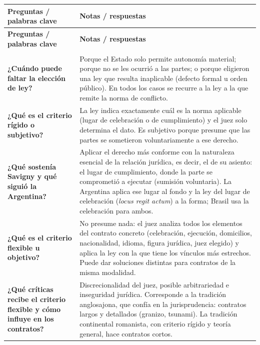 \documentclass[12pt,oneside]{book}
\begin{document}
\begin{longtable}{@{}
    >{\raggedright\arraybackslash}p{}
    >{\raggedright\arraybackslash}p{}@{}}
\toprule
\textbf{Preguntas / palabras clave} & \textbf{Notas / respuestas} \\
\midrule
\endfirsthead
\toprule
\textbf{Preguntas / palabras clave} & \textbf{Notas / respuestas} \\
\midrule
\endhead
\midrule
\multicolumn{2}{r}{\small\textit{continúa en la página siguiente}} \\
\endfoot
\bottomrule
\endlastfoot

\textbf{¿Cuándo puede faltar la elección de ley?} &
Porque el Estado solo permite autonomía material; porque no se les ocurrió a las partes; o porque eligieron una ley que resulta inaplicable (defecto formal u orden público). En todos los casos se recurre a la ley a la que remite la norma de conflicto. \\[0.6em]

\textbf{¿Qué es el criterio rígido o subjetivo?} &
La ley indica exactamente cuál es la norma aplicable (lugar de celebración o de cumplimiento) y el juez solo determina el dato. Es subjetivo porque presume que las partes se sometieron voluntariamente a ese derecho. \\[0.6em]

\textbf{¿Qué sostenía Savigny y qué siguió la Argentina?} &
Aplicar el derecho más conforme con la naturaleza esencial de la relación jurídica, es decir, el de su asiento: el lugar de cumplimiento, donde la parte se comprometió a ejecutar (sumisión voluntaria). La Argentina aplica ese lugar al fondo y la ley del lugar de celebración (\textit{locus regit actum}) a la forma; Brasil usa la celebración para ambos. \\[0.6em]

\textbf{¿Qué es el criterio flexible u objetivo?} &
No presume nada: el juez analiza todos los elementos del contrato concreto (celebración, ejecución, domicilios, nacionalidad, idioma, figura jurídica, juez elegido) y aplica la ley con la que tiene los vínculos más estrechos. Puede dar soluciones distintas para contratos de la misma modalidad. \\[0.6em]

\textbf{¿Qué críticas recibe el criterio flexible y cómo influye en los contratos?} &
Discrecionalidad del juez, posible arbitrariedad e inseguridad jurídica. Corresponde a la tradición anglosajona, que confía en la jurisprudencia: contratos largos y detallados (granizo, tsunami). La tradición continental romanista, con criterio rígido y teoría general, hace contratos cortos. \\[0.6em]


\end{longtable}
\end{document}
